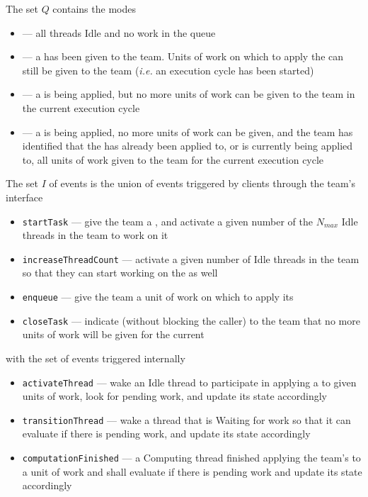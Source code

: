 \documentclass{article}
\begin{document}
The set $Q$ contains the modes
\begin{itemize}
\item{\TeamIdle --- all threads Idle and no work in the queue}
\item{\TeamRunningOpen --- a \taskroutine has been given to the team. Units of work
on which to apply the \taskroutine can still be given to the team (\textit{i.e.} an
execution cycle has been started)}
\item{\TeamRunningClosed --- a \taskroutine is being applied, but no more units
of work can be given to the team in the current execution cycle}
\item{\TeamRunningNoMoreWork --- a \taskroutine is being applied, no more
units of work can be given, and the team has identified that the \taskroutine has
already been applied to, or is currently being applied to, all units of work given
to the team for the current execution cycle}
\end{itemize}

The set $I$ of events is the union of events triggered by clients through the
team's interface
\begin{itemize}
\item{\texttt{startTask} --- give the team a \taskroutine, and activate a given number of the
$N_{max}$ Idle threads in the team to work on it}
\item{\texttt{increaseThreadCount} --- activate a given number of Idle threads in the
team so that they can start working on the \taskroutine as well}
\item{\texttt{enqueue} --- give the team a unit of work on which to apply its
\taskroutine}
\item{\texttt{closeTask} --- indicate (without blocking the caller) to the team
that no more units of work will be given for the current \taskroutine}
\end{itemize}
with the set of events triggered internally
\begin{itemize}
\item{\texttt{activateThread} --- wake an Idle thread to participate
in applying a \taskroutine to given units of work, look for pending work, and update its
state accordingly}
\item{\texttt{transitionThread} --- wake a thread that is Waiting for work so
that it can evaluate if there is pending work, and update its state accordingly}
\item{\texttt{computationFinished} --- a Computing thread finished applying the team's
\taskroutine to a unit of work and shall evaluate if there is pending work and update
its state accordingly}
\end{itemize}
\end{document}
